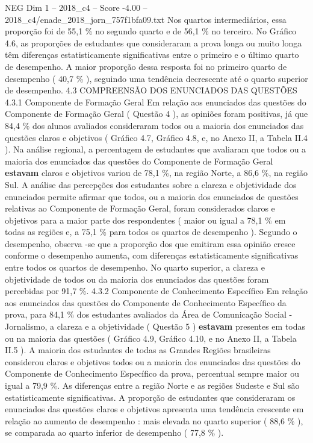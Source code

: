 \begin{textsample}{NEG Dim 1 – 2018\_c4 – Score -4.00 – 2018\_c4/enade\_2018\_jorn\_757f1bfa09.txt}
Nos quartos intermediários, essa proporção foi de 55,1 \% no segundo quarto e de 56,1 \% no terceiro.
No Gráfico 4.6, as proporções de estudantes que consideraram a prova longa ou muito longa têm diferenças estatisticamente significativas entre o primeiro e o último quarto de desempenho.
A maior proporção dessa resposta foi no primeiro quarto de desempenho ( 40,7 \% ), seguindo uma tendência decrescente até o quarto superior de desempenho. 4.3 COMPREENSÃO DOS ENUNCIADOS DAS QUESTÕES 4.3.1 Componente de Formação Geral Em relação aos enunciados das questões do Componente de Formação Geral ( Questão 4 ), as opiniões foram positivas, já que 84,4 \% dos alunos avaliados consideraram todos ou a maioria dos enunciados das questões claros e objetivos ( Gráfico 4.7, Gráfico 4.8, e, no Anexo II, a Tabela II.4 ).
Na análise regional, a percentagem de estudantes que avaliaram que todos ou a maioria dos enunciados das questões do Componente de Formação Geral \textbf{estavam} claros e objetivos variou de 78,1 \%, na região Norte, a 86,6 \%, na região Sul.
A análise das percepções dos estudantes sobre a clareza e objetividade dos enunciados permite afirmar que todos, ou a maioria dos enunciados de questões relativas ao Componente de Formação Geral, foram considerados claros e objetivos para a maior parte dos respondentes ( maior ou igual a 78,1 \% em todas as regiões e, a 75,1 \% para todos os quartos de desempenho ).
Segundo o desempenho, observa -se que a proporção dos que emitiram essa opinião cresce conforme o desempenho aumenta, com diferenças estatisticamente significativas entre todos os quartos de desempenho.
No quarto superior, a clareza e objetividade de todos ou da maioria dos enunciados das questões foram percebidas por 91,7 \%. 4.3.2 Componente de Conhecimento Específico Em relação aos enunciados das questões do Componente de Conhecimento Específico da prova, para 84,1 \% dos estudantes avaliados da Área de Comunicação Social - Jornalismo, a clareza e a objetividade ( Questão 5 ) \textbf{estavam} presentes em todas ou na maioria das questões ( Gráfico 4.9, Gráfico 4.10, e no Anexo II, a Tabela II.5 ).
A maioria dos estudantes de todas as Grandes Regiões brasileiras considerou claros e objetivos todos ou a maioria dos enunciados das questões do Componente de Conhecimento Específico da prova, percentual sempre maior ou igual a 79,9 \%.
As diferenças entre a região Norte e as regiões Sudeste e Sul são estatisticamente significativas.
A proporção de estudantes que consideraram os enunciados das questões claros e objetivos apresenta uma tendência crescente em relação ao aumento de desempenho : mais elevada no quarto superior ( 88,6 \% ), se comparada ao quarto inferior de desempenho ( 77,8 \% ).

\end{textsample}
